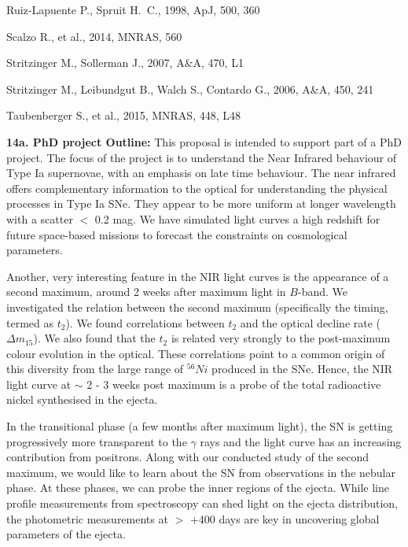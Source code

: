 \documentclass[11pt]{article}
\begin{document}
{\begin{thebibliography}{99}
 Ruiz-Lapuente P., Spruit H.~C., 1998, ApJ, 500, 360 

Scalzo R., et al., 2014, MNRAS, 560 

 Stritzinger M., Sollerman J., 2007, A\&A, 470, L1

 Stritzinger M., Leibundgut B., Walch S.,
Contardo G., 2006, A\&A, 450, 241 

 Taubenberger S., et al., 2015, MNRAS, 448, 
L48 

\end{thebibliography}


\newpage
{\bf 14a. PhD project Outline:}
This proposal is intended to support part of a PhD project. The focus of the project is to understand the Near Infrared behaviour of Type Ia supernovae, with an emphasis on late time behaviour. 
The near infrared offers complementary information to the optical for understanding the physical processes in Type Ia SNe. They appear to be more uniform at longer wavelength with a scatter $< $ 0.2 mag. We have simulated light curves a high redshift for future space-based missions to forecast the constraints on cosmological parameters. 

Another, very interesting feature in the NIR light curves is the appearance of a second maximum, around 2 weeks after maximum light in $B$-band. We investigated the relation between the second maximum (specifically the timing, termed as $t_2$). We found correlations between $t_2$ and the optical decline rate ($\Delta m_{15}$). We also found that the $t_2$ is related very strongly to the post-maximum colour evolution in the optical. These correlations point to a common origin of this diversity from the large range of $^{56}Ni$ produced in the SNe. Hence, the NIR light curve at $\sim$ 2 - 3 weeks post maximum is a probe of the total radioactive nickel synthesised in the ejecta. 

In the transitional phase (a few months after maximum light), the SN is getting progressively more transparent to the $\gamma$ rays and the light curve has an increasing contribution from positrons. Along with our conducted study of the second maximum, we would like to learn about the SN from observations in the nebular phase. At these phases, we can probe the inner regions of the ejecta. While line profile measurements from spectroscopy can shed light on the ejecta distribution, the photometric measurements at $>$ +400 days are key in uncovering global parameters of the ejecta. 

 } 
\newpage
\end{document}
